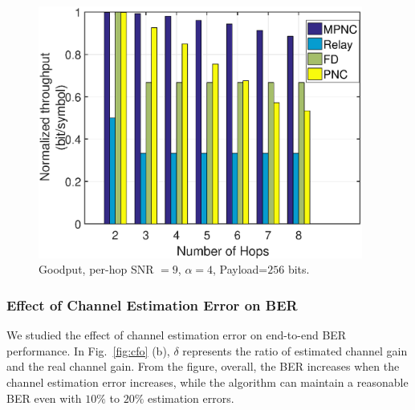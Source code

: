
\begin{figure} [th]
    \centering
    \includegraphics[width=0.95\textwidth]{figures/sim_th_alpha4_snrh2h9BL256}
    \caption{Goodput, per-hop SNR $=9$, $\alpha=4$, Payload=$256$ bits.}
    \label{fig:throughputPNC}
\end{figure}



\subsubsection{Effect of Channel Estimation Error on BER} %
\label{sub:effect_of_channel_estimation}
We studied the effect of channel estimation error %
on end-to-end BER performance. In Fig.~\ref{fig:cfo} (b), $\delta$ represents the ratio of estimated channel gain and the real channel gain. From the figure, 
overall, the BER increases when the channel estimation error increases,  while  the algorithm can maintain a reasonable BER even with $10\%$ to $20\%$
estimation errors. 

